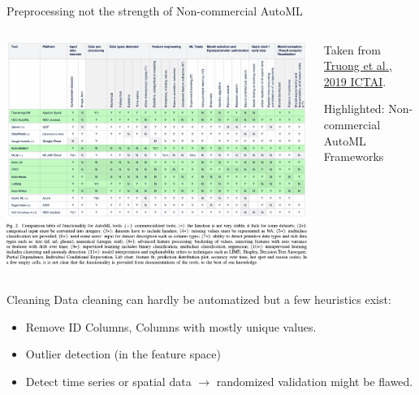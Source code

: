 \begin{frame}{Preprocessing not the strength of Non-commercial AutoML}
  \begin{columns}
    \begin{column}{0.6\textwidth}
      \vspace*{-1cm}
      \begin{center}
        \includegraphics[width = \linewidth]{images/Truong2019Towards_fig2.pdf}
      \end{center}
    \end{column}%
    \begin{column}{0.3\textwidth}
    \small
      Taken from \href{https://doi.org/10.1109/ICTAI.2019.00209}{Truong et al., 2019 ICTAI}.
      \vspace{1em}

      Highlighted: Non-commercial AutoML Frameworks
    \end{column}
  \end{columns}
\end{frame}

\begin{frame}{Cleaning}
  Data cleaning can hardly be automatized but a few heuristics exist:
  \begin{itemize}
    \item Remove ID Columns, Columns with mostly unique values.
    \item Outlier detection (in the feature space)
    \item Detect time series or spatial data $\rightarrow$ randomized validation might be flawed.
  \end{itemize}
\end{frame}

